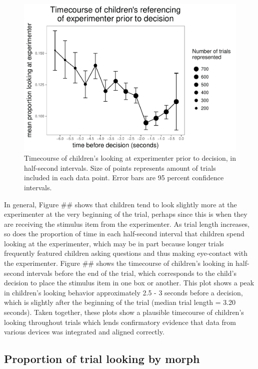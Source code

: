 \documentclass[man]{apa6}
\theoremstyle{definition}
\theoremstyle{definition}
\theoremstyle{definition}
\theoremstyle{remark}
\begin{document}
\begin{figure}
\centering
\includegraphics{soc_ref_category_paper_files/figure-latex/unnamed-chunk-11-1.pdf}
\caption{\label{fig:unnamed-chunk-11}Timecourse of children's looking at
experimenter prior to decision, in half-second intervals. Size of points
represents amount of trials included in each data point. Error bars are
95 percent confidence intervals.}
\end{figure}

In general, Figure \#\# shows that children tend to look slightly more
at the experimenter at the very beginning of the trial, perhaps since
this is when they are receiving the stimulus item from the experimenter.
As trial length increases, so does the proportion of time in each
half-second interval that children spend looking at the experimenter,
which may be in part because longer trials frequently featured children
asking questions and thus making eye-contact with the experimenter.
Figure \#\# shows the timecourse of children's looking in half-second
intervals before the end of the trial, which corresponds to the child's
decision to place the stimulus item in one box or another. This plot
shows a peak in children's looking behavior approximately 2.5 - 3
seconds before a decision, which is slightly after the beginning of the
trial (median trial length = 3.20 seconds). Taken together, these plots
show a plausible timecourse of children's looking throughout trials
which lends confirmatory evidence that data from various devices was
integrated and aligned correctly.

\subsection{Proportion of trial looking by
morph}\label{proportion-of-trial-looking-by-morph}
\end{document}

